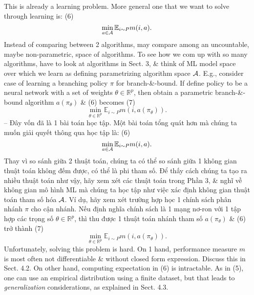 \documentclass{article}
\begin{document}
\begin{itemize}
\begin{itemize}
        This is already a learning problem. More general one that we want to solve through learning is: (6)
        \begin{equation*}
            \min_{a\in{\cal A}} \mathbb{E}_{i\sim P} m(i,a).
        \end{equation*}
        Instead of comparing between 2 algorithms, may compare among an uncountable, maybe non-parametric, space of algorithms. To see how we com up with so many algorithms, have to look at algorithms in Sect. 3, \& think of ML model space over which we learn as defining parametrizing algorithm space ${\cal A}$. E.g., consider case of learning a branching policy $\pi$ for branch-\&-bound. If define policy to be a neural network with a set of weights $\theta\in\mathbb{R}^p$, then obtain a parametric branch-\&-bound algorithm $a(\pi_\theta)$ \& (6) becomes (7)
        \begin{equation*}
            \min_{\theta\in\mathbb{R}^p} \mathbb{E}_{i\sim P} m(i,a(\pi_\theta)).
        \end{equation*}
        -- Đây vốn đã là 1 bài toán học tập. Một bài toán tổng quát hơn mà chúng ta muốn giải quyết thông qua học tập là: (6)
        \begin{equation*}
            \min_{a\in{\cal A}} \mathbb{E}_{i\sim P} m(i,a).
        \end{equation*}
        Thay vì so sánh giữa 2 thuật toán, chúng ta có thể so sánh giữa 1 không gian thuật toán không đếm được, có thể là phi tham số. Để thấy cách chúng ta tạo ra nhiều thuật toán như vậy, hãy xem xét các thuật toán trong Phần 3, \& nghĩ về không gian mô hình ML mà chúng ta học tập như việc xác định không gian thuật toán tham số hóa ${\cal A}$. Ví dụ, hãy xem xét trường hợp học 1 chính sách phân nhánh $\pi$ cho cận nhánh. Nếu định nghĩa chính sách là 1 mạng nơ-ron với 1 tập hợp các trọng số $\theta\in\mathbb{R}^p$, thì thu được 1 thuật toán nhánh tham số $a(\pi_\theta)$ \& (6) trở thành (7)
        \begin{equation*}
            \min_{\theta\in\mathbb{R}^p} \mathbb{E}_{i\sim P} m(i,a(\pi_\theta)).
        \end{equation*}
        Unfortunately, solving this problem is hard. On 1 hand, performance measure $m$ is most often not differentiable \& without closed form expression. Discuss this in Sect. 4.2. On other hand, computing expectation in (6) is intractable. As in (5), one can use an empirical distribution using a finite dataset, but that leads to {\it generalization} considerations, as explained in Sect. 4.3.


\end{itemize}
\end{itemize}
\end{document}
